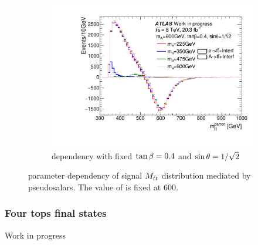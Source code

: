 \begin{figure}
\begin{subfigure}[b]{0.49\textwidth}
\includegraphics[width=\textwidth]{texinputs/04_grid/figures/ttres/ttres_2HDMa_A_ma.pdf}
\caption{\ma dependency with fixed $\tan\beta=0.4$ and $\sin\theta=1/\sqrt{2}$}
\end{subfigure}
\caption{parameter dependency of signal $M_{\bar{t}t}$ distribution mediated by pseudosalars. The value of \mA is fixed at 600\GeV.}
\label{fig:ttres_2HDM_A}
\end{figure}
\FloatBarrier

\subsubsection{Four tops final states}

Work in progress



%



